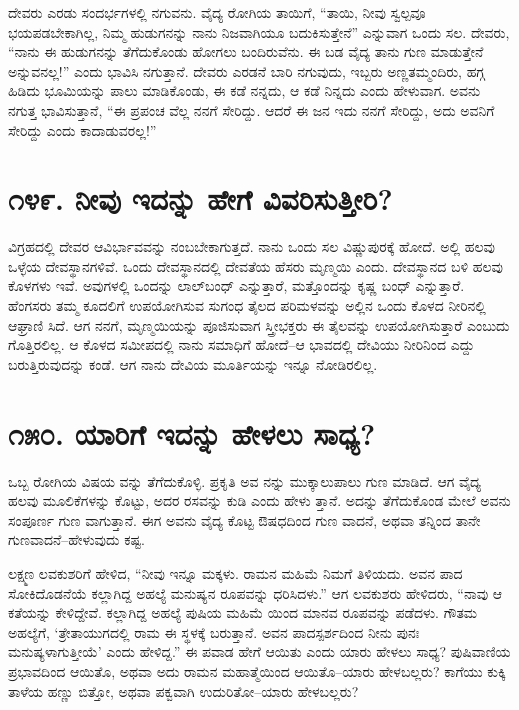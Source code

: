 ದೇವರು ಎರಡು ಸಂದರ್ಭಗಳಲ್ಲಿ ನಗುವನು. ವೈದ್ಯ ರೋಗಿಯ ತಾಯಿಗೆ, “ತಾಯಿ, ನೀವು ಸ್ವಲ್ಪವೂ ಭಯಪಡಬೇಕಾಗಿಲ್ಲ, ನಿಮ್ಮ ಹುಡುಗನನ್ನು ನಾನು ನಿಜವಾಗಿಯೂ ಬದುಕಿಸುತ್ತೇನೆ” ಎನ್ನುವಾಗ ಒಂದು ಸಲ. ದೇವರು, “ನಾನು ಈ ಹುಡುಗನನ್ನು ತೆಗೆದುಕೊಂಡು ಹೋಗಲು ಬಂದಿರುವೆನು. ಈ ಬಡ ವೈದ್ಯ ತಾನು ಗುಣ ಮಾಡುತ್ತೇನೆ ಅನ್ನುವನಲ್ಲ!” ಎಂದು ಭಾವಿಸಿ ನಗುತ್ತಾನೆ. ದೇವರು ಎರಡನೆ ಬಾರಿ ನಗುವುದು, ಇಬ್ಬರು ಅಣ್ಣತಮ್ಮಂದಿರು, ಹಗ್ಗ ಹಿಡಿದು ಭೂಮಿಯನ್ನು ಪಾಲು ಮಾಡಿಕೊಂಡು, ಈ ಕಡೆ ನನ್ನದು, ಆ ಕಡೆ ನಿನ್ನದು ಎಂದು ಹೇಳುವಾಗ. ಅವನು ನಗುತ್ತ ಭಾವಿಸುತ್ತಾನೆ, “ಈ ಪ್ರಪಂಚ ವೆಲ್ಲ ನನಗೆ ಸೇರಿದ್ದು. ಆದರೆ ಈ ಜನ ಇದು ನನಗೆ ಸೇರಿದ್ದು, ಅದು ಅವನಿಗೆ ಸೇರಿದ್ದು ಎಂದು ಕಾದಾಡುವರಲ್ಲ!”


\section{\num{೧೪೯. } ನೀವು ಇದನ್ನು ಹೇಗೆ ವಿವರಿಸುತ್ತೀರಿ?}

ವಿಗ್ರಹದಲ್ಲಿ ದೇವರ ಆವಿರ್ಭಾವವನ್ನು ನಂಬಬೇಕಾಗುತ್ತದೆ. ನಾನು ಒಂದು ಸಲ ವಿಷ್ಣುಪುರಕ್ಕೆ ಹೋದೆ. ಅಲ್ಲಿ ಹಲವು ಒಳ್ಳೆಯ ದೇವಸ್ಥಾನಗಳಿವೆ. ಒಂದು ದೇವಸ್ಥಾನದಲ್ಲಿ ದೇವತೆಯ ಹೆಸರು ಮೃಣ್ಮಯಿ ಎಂದು. ದೇವಸ್ಥಾನದ ಬಳಿ ಹಲವು ಕೊಳಗಳು ಇವೆ. ಅವುಗಳಲ್ಲಿ ಒಂದನ್ನು ಲಾಲ್​ಬಂಧ್ ಎನ್ನುತ್ತಾರೆ, ಮತ್ತೊಂದನ್ನು ಕೃಷ್ಣ ಬಂಧ್ ಎನ್ನುತ್ತಾರೆ. ಹೆಂಗಸರು ತಮ್ಮ ಕೂದಲಿಗೆ ಉಪಯೋಗಿಸುವ ಸುಗಂಧ ತೈಲದ ಪರಿಮಳವನ್ನು ಅಲ್ಲಿನ ಒಂದು ಕೊಳದ ನೀರಿನಲ್ಲಿ ಆಘ್ರಾಣಿ ಸಿದೆ. ಆಗ ನನಗೆ, ಮೃಣ್ಮಯಿಯನ್ನು ಪೂಜಿಸುವಾಗ ಸ್ತ್ರೀಭಕ್ತರು ಈ ತೈಲವನ್ನು ಉಪಯೋಗಿಸುತ್ತಾರೆ ಎಂಬುದು ಗೊತ್ತಿರಲಿಲ್ಲ. ಆ ಕೊಳದ ಸಮೀಪದಲ್ಲಿ ನಾನು ಸಮಾಧಿಗೆ ಹೋದೆ–ಆ ಭಾವದಲ್ಲಿ ದೇವಿಯು ನೀರಿನಿಂದ ಎದ್ದು ಬರುತ್ತಿರುವುದನ್ನು ಕಂಡೆ. ಆಗ ನಾನು ದೇವಿಯ ಮೂರ್ತಿಯನ್ನು ಇನ್ನೂ ನೋಡಿರಲಿಲ್ಲ.


\section{\num{೧೫೦. } ಯಾರಿಗೆ ಇದನ್ನು ಹೇಳಲು ಸಾಧ್ಯ?}

ಒಬ್ಬ ರೋಗಿಯ ವಿಷಯ ವನ್ನು ತೆಗೆದುಕೊಳ್ಳಿ. ಪ್ರಕೃತಿ ಅವ ನನ್ನು ಮುಕ್ಕಾಲುಪಾಲು ಗುಣ ಮಾಡಿದೆ. ಆಗ ವೈದ್ಯ ಹಲವು ಮೂಲಿಕೆಗಳನ್ನು ಕೊಟ್ಟು, ಅದರ ರಸವನ್ನು ಕುಡಿ ಎಂದು ಹೇಳು ತ್ತಾನೆ. ಅದನ್ನು ತೆಗೆದುಕೊಂಡ ಮೇಲೆ ಅವನು ಸಂಪೂರ್ಣ ಗುಣ ವಾಗುತ್ತಾನೆ. ಈಗ ಅವನು ವೈದ್ಯ ಕೊಟ್ಟ ಔಷಧದಿಂದ ಗುಣ ವಾದನೆ, ಅಥವಾ ತನ್ನಿಂದ ತಾನೇ ಗುಣವಾದನೆ–ಹೇಳುವುದು ಕಷ್ಟ.

ಲಕ್ಷ್ಮಣ ಲವಕುಶರಿಗೆ ಹೇಳಿದ, “ನೀವು ಇನ್ನೂ ಮಕ್ಕಳು. ರಾಮನ ಮಹಿಮೆ ನಿಮಗೆ ತಿಳಿಯದು. ಅವನ ಪಾದ ಸೋಕಿದೊಡನೆಯೆ ಕಲ್ಲಾಗಿದ್ದ ಅಹಲ್ಯೆ ಮನುಷ್ಯನ ರೂಪವನ್ನು ಧರಿಸಿದಳು.” ಆಗ ಲವಕುಶರು ಹೇಳಿದರು, “ನಾವು ಆ ಕತೆಯನ್ನು ಕೇಳಿದ್ದೇವೆ. ಕಲ್ಲಾಗಿದ್ದ ಅಹಲ್ಯೆ ಪುಷಿಯ ಮಹಿಮೆ ಯಿಂದ ಮಾನವ ರೂಪವನ್ನು ಪಡೆದಳು. ಗೌತಮ ಅಹಲ್ಯೆಗೆ, ‘ತ್ರೇತಾಯುಗದಲ್ಲಿ ರಾಮ ಈ ಸ್ಥಳಕ್ಕೆ ಬರುತ್ತಾನೆ. ಅವನ ಪಾದಸ್ಪರ್ಶದಿಂದ ನೀನು ಪುನಃ ಮನುಷ್ಯಳಾಗುತ್ತೀಯೆ’ ಎಂದು ಹೇಳಿದ್ದ.” ಈ ಪವಾಡ ಹೇಗೆ ಆಯಿತು ಎಂದು ಯಾರು ಹೇಳಲು ಸಾಧ್ಯ? ಪುಷಿವಾಣಿಯ ಪ್ರಭಾವದಿಂದ ಆಯಿತೊ, ಅಥವಾ ಅದು ರಾಮನ ಮಹಾತ್ಮೆಯಿಂದ ಆಯಿತೊ–ಯಾರು ಹೇಳಬಲ್ಲರು? ಕಾಗೆಯು ಕುಕ್ಕಿ ತಾಳೆಯ ಹಣ್ಣು ಬಿತ್ತೋ, ಅಥವಾ ಪಕ್ವವಾಗಿ ಉದುರಿತೋ–ಯಾರು ಹೇಳಬಲ್ಲರು?

